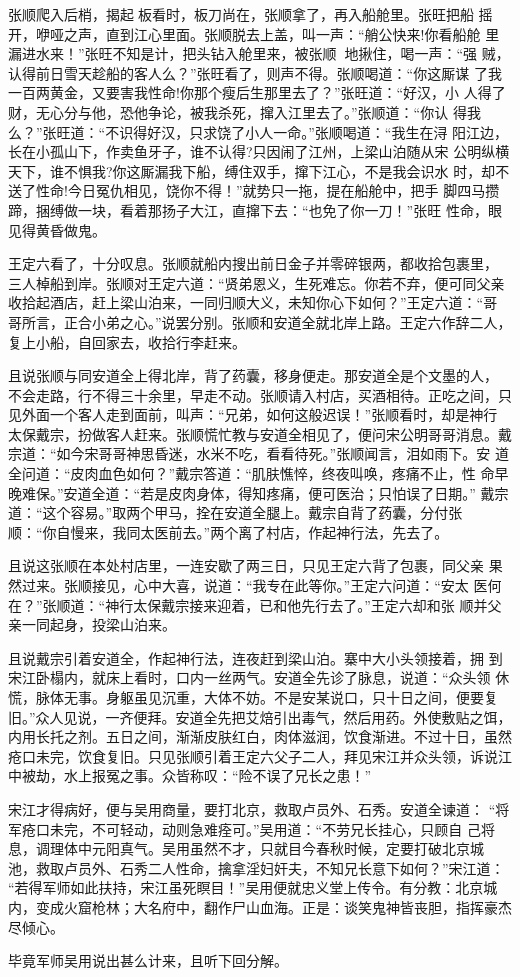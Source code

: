 张顺爬入后梢，揭起板看时，板刀尚在，张顺拿了，再入船舱里。张旺把船
摇开，咿哑之声，直到江心里面。张顺脱去上盖，叫一声：“艄公快来!你看船舱
里漏进水来！”张旺不知是计，把头钻入舱里来，被张顺地揪住，喝一声：“强
贼，认得前日雪天趁船的客人么？”张旺看了，则声不得。张顺喝道：“你这厮谋
了我一百两黄金，又要害我性命!你那个瘦后生那里去了？”张旺道：“好汉，小
人得了财，无心分与他，恐他争论，被我杀死，撺入江里去了。”张顺道：“你认
得我么？”张旺道：“不识得好汉，只求饶了小人一命。”张顺喝道：“我生在浔
阳江边，长在小孤山下，作卖鱼牙子，谁不认得?只因闹了江州，上梁山泊随从宋
公明纵横天下，谁不惧我?你这厮漏我下船，缚住双手，撺下江心，不是我会识水
时，却不送了性命!今日冤仇相见，饶你不得！”就势只一拖，提在船舱中，把手
脚四马攒蹄，捆缚做一块，看着那扬子大江，直撺下去：“也免了你一刀！”张旺
性命，眼见得黄昏做鬼。

王定六看了，十分叹息。张顺就船内搜出前日金子并零碎银两，都收拾包裹里，
三人棹船到岸。张顺对王定六道：“贤弟恩义，生死难忘。你若不弃，便可同父亲
收拾起酒店，赶上梁山泊来，一同归顺大义，未知你心下如何？”王定六道：“哥
哥所言，正合小弟之心。”说罢分别。张顺和安道全就北岸上路。王定六作辞二人，
复上小船，自回家去，收拾行李赶来。

且说张顺与同安道全上得北岸，背了药囊，移身便走。那安道全是个文墨的人，
不会走路，行不得三十余里，早走不动。张顺请入村店，买酒相待。正吃之间，只
见外面一个客人走到面前，叫声：“兄弟，如何这般迟误！”张顺看时，却是神行
太保戴宗，扮做客人赶来。张顺慌忙教与安道全相见了，便问宋公明哥哥消息。戴
宗道：“如今宋哥哥神思昏迷，水米不吃，看看待死。”张顺闻言，泪如雨下。安
道全问道：“皮肉血色如何？”戴宗答道：“肌肤憔悴，终夜叫唤，疼痛不止，性
命早晚难保。”安道全道：“若是皮肉身体，得知疼痛，便可医治；只怕误了日期。”
戴宗道：“这个容易。”取两个甲马，拴在安道全腿上。戴宗自背了药囊，分付张
顺：“你自慢来，我同太医前去。”两个离了村店，作起神行法，先去了。

且说这张顺在本处村店里，一连安歇了两三日，只见王定六背了包裹，同父亲
果然过来。张顺接见，心中大喜，说道：“我专在此等你。”王定六问道：“安太
医何在？”张顺道：“神行太保戴宗接来迎着，已和他先行去了。”王定六却和张
顺并父亲一同起身，投梁山泊来。

且说戴宗引着安道全，作起神行法，连夜赶到梁山泊。寨中大小头领接着，拥
到宋江卧榻内，就床上看时，口内一丝两气。安道全先诊了脉息，说道：“众头领
休慌，脉体无事。身躯虽见沉重，大体不妨。不是安某说口，只十日之间，便要复
旧。”众人见说，一齐便拜。安道全先把艾焙引出毒气，然后用药。外使敷贴之饵，
内用长托之剂。五日之间，渐渐皮肤红白，肉体滋润，饮食渐进。不过十日，虽然
疮口未完，饮食复旧。只见张顺引着王定六父子二人，拜见宋江并众头领，诉说江
中被劫，水上报冤之事。众皆称叹：“险不误了兄长之患！”

宋江才得病好，便与吴用商量，要打北京，救取卢员外、石秀。安道全谏道：
“将军疮口未完，不可轻动，动则急难痊可。”吴用道：“不劳兄长挂心，只顾自
己将息，调理体中元阳真气。吴用虽然不才，只就目今春秋时候，定要打破北京城
池，救取卢员外、石秀二人性命，擒拿淫妇奸夫，不知兄长意下如何？”宋江道：
“若得军师如此扶持，宋江虽死瞑目！”吴用便就忠义堂上传令。有分教：北京城
内，变成火窟枪林；大名府中，翻作尸山血海。正是：谈笑鬼神皆丧胆，指挥豪杰
尽倾心。

毕竟军师吴用说出甚么计来，且听下回分解。